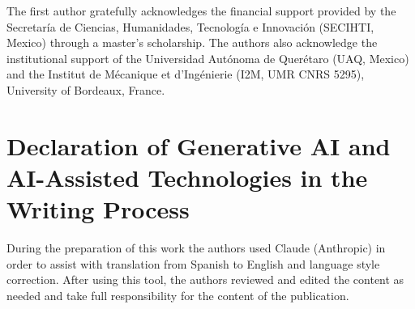 \documentclass[preprint,12pt,authoryear]{elsarticle}
\begin{document}
The first author gratefully acknowledges the financial support provided by the
Secretaría de Ciencias, Humanidades, Tecnología e Innovación (SECIHTI, Mexico)
through a master's scholarship. The authors also acknowledge the institutional
support of the Universidad Autónoma de Querétaro (UAQ, Mexico) and the Institut
de Mécanique et d'Ingénierie (I2M, UMR CNRS 5295), University of Bordeaux,
France.

\section*{Declaration of Generative AI and AI-Assisted Technologies in the
Writing Process}

During the preparation of this work the authors used Claude (Anthropic) in order
to assist with translation from Spanish to English and language style correction.
After using this tool, the authors reviewed and edited the content as needed and
take full responsibility for the content of the publication.



\end{document}
